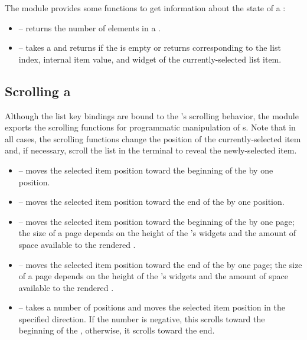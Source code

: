 The  module provides some functions to get information about
the state of a :

\begin{itemize}
\item {} -- returns the number of elements in a
  .
\item {} -- takes a  and returns
   if the  is empty or returns  corresponding to the list index, internal item
  value, and widget of the currently-selected list item.
\end{itemize}

\subsection{Scrolling a }
\label{sec:list_scrolling}

Although the list key bindings are bound to the 's scrolling
behavior, the  module exports the scrolling functions for
programmatic manipulation of s.  Note that in all cases, the
scrolling functions change the position of the currently-selected item
and, if necessary, scroll the list in the terminal to reveal the
newly-selected item.

\begin{itemize}
\item {} -- moves the selected item position toward the
  beginning of the  by one position.
\item {} -- moves the selected item position toward the
  end of the  by one position.
\item {} -- moves the selected item position toward the
  beginning of the  by one page; the size of a page depends
  on the height of the 's widgets and the amount of space
  available to the rendered .
\item {} -- moves the selected item position toward the end
  of the  by one page; the size of a page depends on the
  height of the 's widgets and the amount of space available
  to the rendered .
\item {} -- takes a number of positions and moves the
  selected item position in the specified direction.  If the number is
  negative, this scrolls toward the beginning of the ,
  otherwise, it scrolls toward the end.
\end{itemize}

